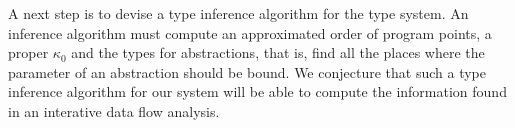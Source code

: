 \documentclass{eptcs}
\begin{document}



A next step is to devise a type inference algorithm for the type
system. An inference algorithm must compute an approximated order of
program points, a proper $\kappa_0$ and the types for abstractions,
that is, find all the places where the parameter of an abstraction
should be bound.  We conjecture that such a type inference algorithm
for our system will be able to compute the information found in an
interative data flow analysis.



\end{document}
